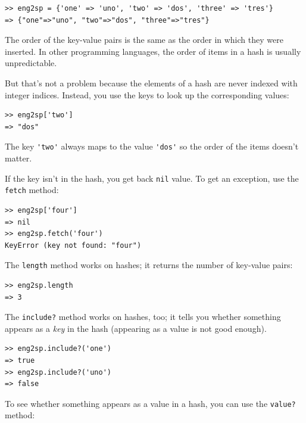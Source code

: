 \documentclass[10pt]{book}
\begin{document}
\begin{verbatim}
>> eng2sp = {'one' => 'uno', 'two' => 'dos', 'three' => 'tres'}
=> {"one"=>"uno", "two"=>"dos", "three"=>"tres"}
\end{verbatim}
%
%
The order of the key-value pairs is the same as the order in
which they were inserted.  In other programming languages,
the order of items in a hash is usually unpredictable.

But that's not a problem because
the elements of a hash are never indexed with integer indices.
Instead, you use the keys to look up the corresponding values:

\begin{verbatim}
>> eng2sp['two']
=> "dos"
\end{verbatim}
%
The key \verb"'two'" always maps to the value \verb"'dos'" so the order
of the items doesn't matter.

If the key isn't in the hash, you get back {\tt nil} value.  To get
an exception, use the {\tt fetch} method:

\begin{verbatim}
>> eng2sp['four']
=> nil
>> eng2sp.fetch('four')
KeyError (key not found: "four")
\end{verbatim}
%
The {\tt length} method works on hashes; it returns the
number of key-value pairs:

\begin{verbatim}
>> eng2sp.length
=> 3
\end{verbatim}
%
The {\tt include?} method works on hashes, too; it tells you whether
something appears as a {\em key} in the hash (appearing
as a value is not good enough).

\begin{verbatim}
>> eng2sp.include?('one')
=> true
>> eng2sp.include?('uno')
=> false
\end{verbatim}
%
To see whether something appears as a value in a hash, you
can use the {\tt value?} method:
\end{document}

